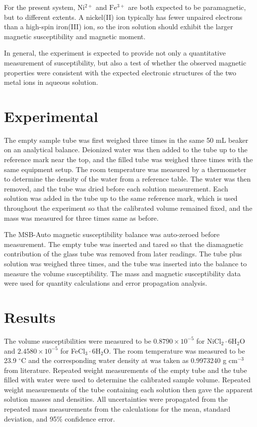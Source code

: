 \documentclass[12pt]{article}
\begin{document}
For the present system, \(\mathrm{Ni^{2+}}\) and \(\mathrm{Fe^{3+}}\) are both expected to be paramagnetic, but to different extents. A nickel(II) ion typically has fewer unpaired electrons than a high-spin iron(III) ion, so the iron solution should exhibit the larger magnetic susceptibility and magnetic moment. 

In general, the experiment is expected to provide not only a quantitative measurement of susceptibility, but also a test of whether the observed magnetic properties were consistent with the expected electronic structures of the two metal ions in aqueous solution.


\section*{Experimental}
The empty sample tube was first weighed three times in the same 50 mL beaker on an analytical balance. Deionized water was then added to the tube up to the reference mark near the top, and the filled tube was weighed three times with the same equipment setup. The room temperature was measured by a thermometer to determine the density of the water from a reference table. The water was then removed, and the tube was dried before each solution measurement. Each solution was added in the tube up to the same reference mark, which is used throughout the experiment so that the calibrated volume remained fixed, and the mass was measured for three times same as before.

The MSB-Auto magnetic susceptibility balance was auto-zeroed before measurement. The empty tube was inserted and tared so that the diamagnetic contribution of the glass tube was removed from later readings. The tube plus solution was weighed three times, and the tube was inserted into the balance to measure the volume susceptibility. The mass and magnetic susceptibility data were used for quantity calculations and error propagation analysis.

\section*{Results}
The volume susceptibilities were measured to be $0.8790\times10^{-5}$ for NiCl$_2\cdot$6H$_2$O and $2.4580\times10^{-5}$ for FeCl$_3\cdot$6H$_2$O. The room temperature was measured to be 23.9 $^{\circ}$C and the corresponding water density at was taken as 0.9973240 g cm$^{-3}$ from literature.\cite{kienitz1981litwater} Repeated weight measurements of the empty tube and the tube filled with water were used to determine the calibrated sample volume. Repeated weight measurements of the tube containing each solution then gave the apparent solution masses and densities. All uncertainties were propagated from the repeated mass measurements from the calculations for the mean, standard deviation, and 95\% confidence error.\
\end{document}
